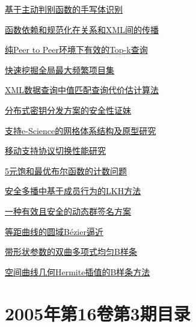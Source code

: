\documentclass[a4paper]{article}
\begin{document}
\href{http://www.jos.org.cn/ch/reader/download_pdf.aspx?file_no=20050405&year_id=2005&quarter_id=4&falg=1}{基于主动判别函数的手写体识别}

\href{http://www.jos.org.cn/ch/reader/download_pdf.aspx?file_no=20050406&year_id=2005&quarter_id=4&falg=1}{函数依赖和规范化在关系和XML间的传播}

\href{http://www.jos.org.cn/ch/reader/download_pdf.aspx?file_no=20050407&year_id=2005&quarter_id=4&falg=1}{纯Peer to Peer环境下有效的Top-k查询}

\href{http://www.jos.org.cn/ch/reader/download_pdf.aspx?file_no=20050408&year_id=2005&quarter_id=4&falg=1}{快速挖掘全局最大频繁项目集}

\href{http://www.jos.org.cn/ch/reader/download_pdf.aspx?file_no=20050409&year_id=2005&quarter_id=4&falg=1}{XML数据查询中值匹配查询代价估计算法}

\href{http://www.jos.org.cn/ch/reader/download_pdf.aspx?file_no=20050410&year_id=2005&quarter_id=4&falg=1}{分布式密钥分发方案的安全性证妹}

\href{http://www.jos.org.cn/ch/reader/download_pdf.aspx?file_no=20050411&year_id=2005&quarter_id=4&falg=1}{支持e-Science的网格体系结构及原型研究}

\href{http://www.jos.org.cn/ch/reader/download_pdf.aspx?file_no=20050412&year_id=2005&quarter_id=4&falg=1}{移动支持协议切换性能研究}

\href{http://www.jos.org.cn/ch/reader/download_pdf.aspx?file_no=20050413&year_id=2005&quarter_id=4&falg=1}{5元饱和最优布尔函数的计数问题}

\href{http://www.jos.org.cn/ch/reader/download_pdf.aspx?file_no=20050414&year_id=2005&quarter_id=4&falg=1}{安全多播中基于成员行为的LKH方法}

\href{http://www.jos.org.cn/ch/reader/download_pdf.aspx?file_no=20050415&year_id=2005&quarter_id=4&falg=1}{一种有效且安全的动态群签名方案}

\href{http://www.jos.org.cn/ch/reader/download_pdf.aspx?file_no=20050416&year_id=2005&quarter_id=4&falg=1}{等距曲线的圆域Bézier逼近}

\href{http://www.jos.org.cn/ch/reader/download_pdf.aspx?file_no=20050417&year_id=2005&quarter_id=4&falg=1}{带形状参数的双曲多项式均匀B样条}

\href{http://www.jos.org.cn/ch/reader/download_pdf.aspx?file_no=20050418&year_id=2005&quarter_id=4&falg=1}{空间曲线几何Hermite插值的B样条方法}


\section{\textbf{2005年第16卷第3期目录}}
\end{document}
